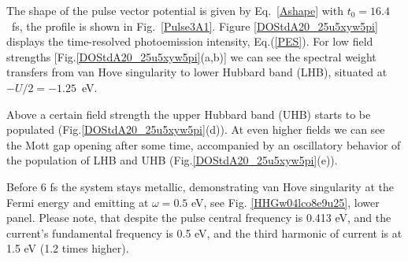The shape of the pulse vector potential is given by Eq.~\ref{Ashape} with $t_0=16.4$~fs, the profile is shown in Fig.~\ref{Pulse3A1}.  
Figure \ref{DOStdA20_25u5xyw5pi} displays the time-resolved photoemission intensity, Eq.(\ref{PES}).  
For low field strengths [Fig.\ref{DOStdA20_25u5xyw5pi}(a,b)]
 we can see the spectral weight transfers from van Hove singularity to lower Hubbard band (LHB), situated at $-U/2=-1.25$~eV. 

{\color{red}{@HA I don't understand this.  Take $t$ (nearest-neighbor hopping) as the unit of energy.  Then indicate the energy position of the vH singularity. }} 
{\color{red}{@HA As the initial state, where is the peak of the population density located?  }}
{\color{red}{@HA The color code around t (time) = 0 is no clear.  Another quite important factor is, you are dealing with the half-filled case, right?  }}
{\color{red}{@HA Then, initially, the density should be electron-hole symmetric about E=0, but this is not clear, either. }} 
{\color{blue}{@EG we changed the figures (that actually suffered from imperfectness of the Fourier transform applied, leading e.g. to particle-hole asymmetry at t=0) from population density (not used anymore) to simulated photoemission spectra (with probe FWHM = 2.5 fs)}}
 
Above a certain field strength the upper Hubbard band (UHB) starts to be populated (Fig.\ref{DOStdA20_25u5xyw5pi}(d)). At even higher fields we can see the Mott gap opening after some time, accompanied by an oscillatory behavior of the population of LHB and UHB (Fig.\ref{DOStdA20_25u5xyw5pi}(e)).


Before 6 fs the system stays metallic, 
demonstrating van Hove singularity at the Fermi energy 
and emitting
at $\omega=0.5$ eV, see Fig. \ref{HHGw04lco8e9u25}, lower panel.
Please note, that despite the pulse central frequency is 0.413 eV, and the current's fundamental frequency is 0.5 eV, and the third harmonic of current is at 1.5 eV (1.2 times higher).
 
